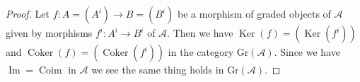 \documentclass[10pt,a4paper]{amsart}
\theoremstyle{plain}
\theoremstyle{definition}
\theoremstyle{remark}
\numberwithin{equation}{subsection}
\def\Ker{\mathop{\mathrm{Ker}}}
\def\Im{\mathop{\mathrm{Im}}}
\def\Coker{\mathop{\mathrm{Coker}}}
\def\Coim{\mathop{\mathrm{Coim}}}
\begin{document}
\begin{proof}
Let $f : A = (A^i) \to B = (B^i)$ be a morphism of graded objects
of $\mathcal{A}$ given by
morphisms $f^i : A^i \to B^i$ of $\mathcal{A}$.
Then we have $\Ker(f) = (\Ker(f^i))$ and $\Coker(f) = (\Coker(f^i))$
in the category $\text{Gr}(\mathcal{A})$.
Since we have $\Im = \Coim$ in $\mathcal{A}$
we see the same thing holds in $\text{Gr}(\mathcal{A})$.
\end{proof}
\end{document}
